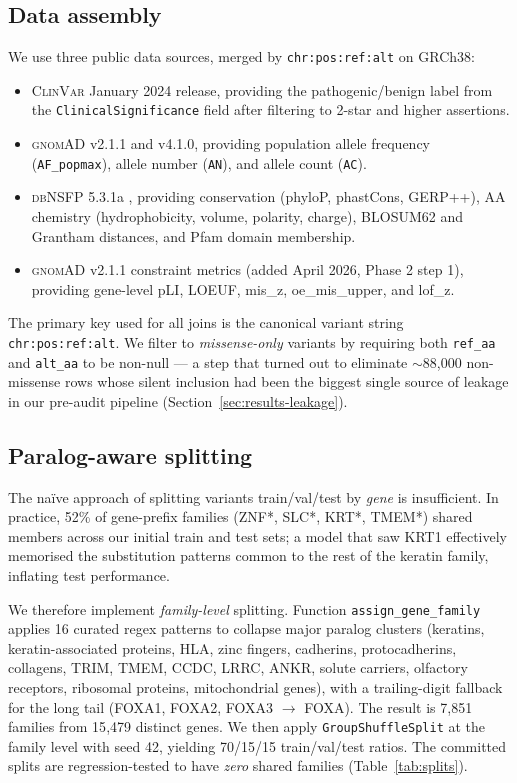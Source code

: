 \documentclass[11pt,a4paper]{article}
\begin{document}
\subsection{Data assembly}

We use three public data sources, merged by \texttt{chr:pos:ref:alt}
on GRCh38:

\begin{itemize}
    \item \textsc{ClinVar} January 2024 release, providing the
          pathogenic/benign label from the \texttt{ClinicalSignificance}
          field after filtering to 2-star and higher assertions.
    \item \textsc{gnomAD} v2.1.1 and v4.1.0, providing population
          allele frequency (\texttt{AF\_popmax}), allele number
          (\texttt{AN}), and allele count (\texttt{AC}).
    \item \textsc{dbNSFP} 5.3.1a \citep{liu2020dbnsfp}, providing
          conservation (phyloP, phastCons, GERP++), AA chemistry
          (hydrophobicity, volume, polarity, charge), BLOSUM62 and
          Grantham distances, and Pfam domain membership.
    \item \textsc{gnomAD} v2.1.1 constraint metrics (added April
          2026, Phase 2 step 1), providing gene-level pLI, LOEUF,
          mis\_z, oe\_mis\_upper, and lof\_z.
\end{itemize}

The primary key used for all joins is the canonical variant string
\texttt{chr:pos:ref:alt}. We filter to \emph{missense-only} variants
by requiring both \texttt{ref\_aa} and \texttt{alt\_aa} to be
non-null --- a step that turned out to eliminate
\(\sim\)88{,}000 non-missense rows whose silent inclusion had been
the biggest single source of leakage in our pre-audit pipeline
(Section~\ref{sec:results-leakage}).

\subsection{Paralog-aware splitting}
\label{sec:methods-splits}

The naïve approach of splitting variants train/val/test by
\emph{gene} is insufficient. In practice, 52\% of gene-prefix
families (ZNF*, SLC*, KRT*, TMEM*) shared members across our
initial train and test sets; a model that saw KRT1 effectively
memorised the substitution patterns common to the rest of the
keratin family, inflating test performance.

We therefore implement \emph{family-level} splitting. Function
\texttt{assign\_gene\_family} applies 16 curated regex patterns to
collapse major paralog clusters (keratins, keratin-associated
proteins, HLA, zinc fingers, cadherins, protocadherins, collagens,
TRIM, TMEM, CCDC, LRRC, ANKR, solute carriers, olfactory
receptors, ribosomal proteins, mitochondrial genes), with a
trailing-digit fallback for the long tail (FOXA1, FOXA2, FOXA3
\(\to\) FOXA). The result is 7{,}851 families from 15{,}479
distinct genes. We then apply \texttt{GroupShuffleSplit} at the
family level with seed 42, yielding 70/15/15 train/val/test
ratios. The committed splits are regression-tested to have
\emph{zero} shared families (Table~\ref{tab:splits}).
\end{document}
